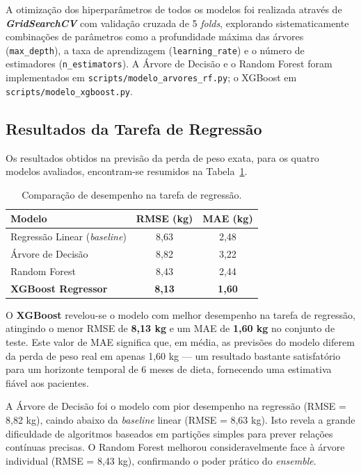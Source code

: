 A otimização dos hiperparâmetros de todos os modelos foi realizada através de \textbf{\textit{GridSearchCV}} com validação cruzada de 5 \textit{folds}, explorando sistematicamente combinações de parâmetros como a profundidade máxima das árvores (\texttt{max\_depth}), a taxa de aprendizagem (\texttt{learning\_rate}) e o número de estimadores (\texttt{n\_estimators}). A Árvore de Decisão e o Random Forest foram implementados em \texttt{scripts/modelo\_arvores\_rf.py}; o XGBoost em \texttt{scripts/modelo\_xgboost.py}.

\subsection{Resultados da Tarefa de Regressão}

Os resultados obtidos na previsão da perda de peso exata, para os quatro modelos avaliados, encontram-se resumidos na Tabela~\ref{tab:regressao}.

\begin{table}[h!]
\centering
\caption{Comparação de desempenho na tarefa de regressão.}
\label{tab:regressao}
\begin{tabular}{lcc}
\hline
\textbf{Modelo} & \textbf{RMSE (kg)} & \textbf{MAE (kg)} \\
\hline
Regressão Linear (\textit{baseline}) & 8,63 & 2,48 \\
Árvore de Decisão & 8,82 & 3,22 \\
Random Forest & 8,43 & 2,44 \\
\textbf{XGBoost Regressor} & \textbf{8,13} & \textbf{1,60} \\
\hline
\end{tabular}
\end{table}

O \textbf{XGBoost} revelou-se o modelo com melhor desempenho na tarefa de regressão, atingindo o menor RMSE de \textbf{8,13 kg} e um MAE de \textbf{1,60 kg} no conjunto de teste. Este valor de MAE significa que, em média, as previsões do modelo diferem da perda de peso real em apenas 1,60 kg --- um resultado bastante satisfatório para um horizonte temporal de 6 meses de dieta, fornecendo uma estimativa fiável aos pacientes.

A Árvore de Decisão foi o modelo com pior desempenho na regressão (RMSE = 8,82 kg), caindo abaixo da \textit{baseline} linear (RMSE = 8,63 kg). Isto revela a grande dificuldade de algoritmos baseados em partições simples para prever relações contínuas precisas. O Random Forest melhorou consideravelmente face à árvore individual (RMSE = 8,43 kg), confirmando o poder prático do \textit{ensemble}. 


